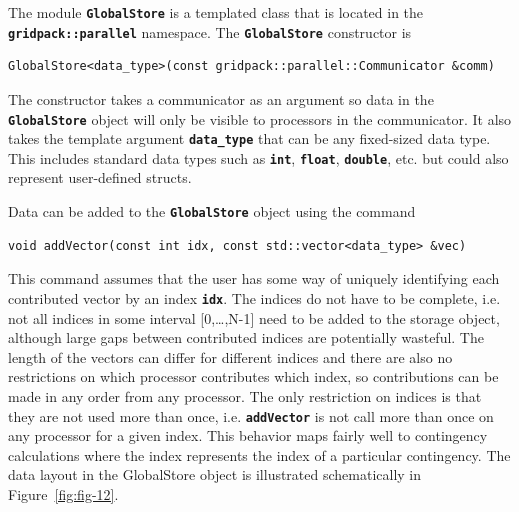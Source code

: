 \documentclass[12pt]{report} %
\begin{document}
The module \texttt{\textbf{GlobalStore}} is a templated class that is located in the \texttt{\textbf{gridpack::parallel}} namespace. The \texttt{\textbf{GlobalStore}} constructor is

{
\color{red}
\begin{Verbatim}[fontseries=b]
GlobalStore<data_type>(const gridpack::parallel::Communicator &comm)
\end{Verbatim}
}

The constructor takes a communicator as an argument so data in the \texttt{\textbf{GlobalStore}} object will only be visible to processors in the communicator. It also takes the template argument \texttt{\textbf{data\_type}} that can be any fixed-sized data type. This includes standard data types such as \texttt{\textbf{int}}, \texttt{\textbf{float}}, \texttt{\textbf{double}}, etc. but could also represent user-defined structs.

Data can be added to the \texttt{\textbf{GlobalStore}} object using the command

{
\color{red}
\begin{Verbatim}[fontseries=b]
void addVector(const int idx, const std::vector<data_type> &vec)
\end{Verbatim}
}

This command assumes that the user has some way of uniquely identifying each contributed vector by an index \texttt{\textbf{idx}}. The indices do not have to be complete, i.e. not all indices in some interval [0,{\dots},N-1] need to be added to the storage object, although large gaps between contributed indices are potentially wasteful. The length of the vectors can differ for different indices and there are also no restrictions on which processor contributes which index, so contributions can be made in any order from any processor. The only restriction on indices is that they are not used more than once, i.e. \texttt{\textbf{addVector}} is not call more than once on any processor for a given index. This behavior maps fairly well to contingency calculations where the index represents the index of a particular contingency. The data layout in the GlobalStore object is illustrated schematically in Figure~\ref{fig:fig-12}.
\end{document}
